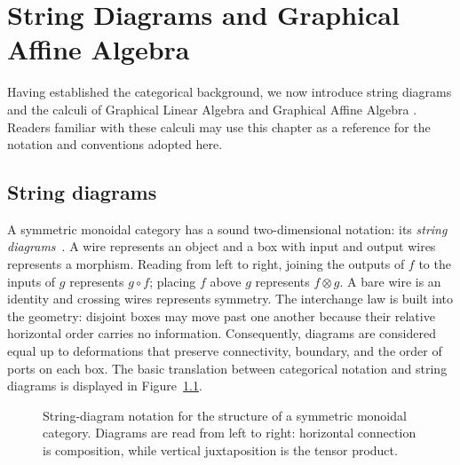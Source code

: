 \chapter{String Diagrams and Graphical Affine Algebra}\label{sec:gaa}

Having established the categorical background, we now introduce string diagrams
and the calculi of Graphical Linear Algebra and Graphical Affine Algebra
\cite{bonchi2019affine}. Readers familiar with these calculi may use this chapter
as a reference for the notation and conventions adopted here.

\section{String diagrams}\label{sec:string-diagrams}

A symmetric monoidal category has a sound two-dimensional notation: its
\emph{string diagrams}~\cite{joyal1991geometry,selinger2010survey}.  A wire
represents an object and a box with input and output wires represents a
morphism.  Reading from left to right, joining the outputs of $f$ to the inputs
of $g$ represents $g\circ f$; placing $f$ above $g$ represents $f\otimes g$.
A bare wire is an identity and crossing wires represents symmetry.  The
interchange law is built into the geometry: disjoint boxes may move past one
another because their relative horizontal order carries no information.
Consequently, diagrams are considered equal up to deformations that preserve
connectivity, boundary, and the order of ports on each box.  The basic
translation between categorical notation and string diagrams is displayed in
Figure~\ref{fig:appendix-string-diagram-dictionary}.

\begin{figure}[H]
\centering
{}
\caption{String-diagram notation for the structure of a symmetric monoidal
category.  Diagrams are read from left to right: horizontal connection is
composition, while vertical juxtaposition is the tensor product.}
\label{fig:appendix-string-diagram-dictionary}
\end{figure}

